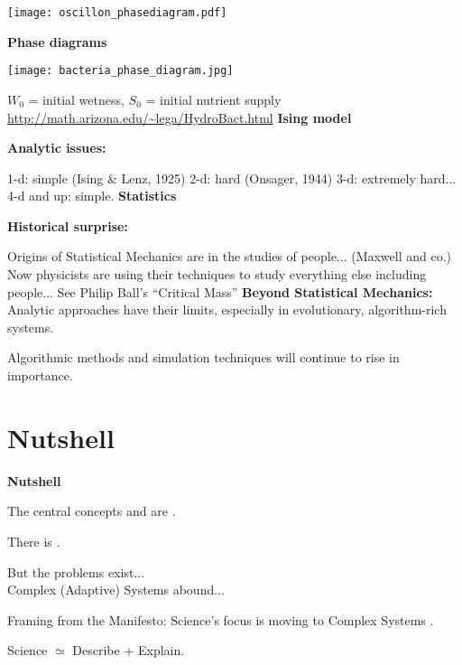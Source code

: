   \begin{center}
    \texttt{[image: oscillon\_phasediagram.pdf]}
  \end{center}
  \textbf{Phase diagrams}

  \begin{center}
    \texttt{[image: bacteria\_phase\_diagram.jpg]}
  \end{center}

  {\tiny $W_0$ = initial wetness, $S_0$ = initial nutrient supply\\
    \url{http://math.arizona.edu/~lega/HydroBact.html}}
  \textbf{Ising model}

  \textbf{Analytic issues:}
    
     1-d: simple (Ising \& Lenz, 1925)
     2-d: hard (Onsager, 1944)
     3-d: extremely hard...
     4-d and up: simple.
  \textbf{Statistics}

  \textbf{Historical surprise:}
  
   Origins of Statistical Mechanics are in the studies of people...
    (Maxwell and co.)
   Now physicists are using their techniques to study everything else
    including people...
   See Philip Ball's ``Critical Mass''\cite{ball2004a}
  \textbf{Beyond Statistical Mechanics:}
      Analytic approaches have their limits,
      especially in evolutionary, algorithm-rich systems.
    
      Algorithmic methods and simulation techniques will continue
      to rise in importance.
\section{Nutshell}
  \textbf{Nutshell}
  
  
    The central concepts  and
     are .
  
    There is .
  
    But the problems exist...\\
    \qquad \qquad Complex (Adaptive) Systems abound...
  
    Framing from the Manifesto: Science's focus is moving to Complex Systems 
    .
  
  
    Science $\simeq$ Describe + Explain.
